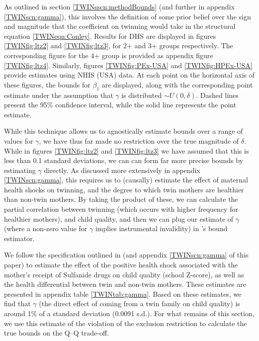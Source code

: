 As outlined in section \ref{TWINsscn:methodBounds} (and further in appendix
\ref{TWINscn:gamma}), this involves the definition of some prior belief over 
the sign and magnitude that the coefficient on twinning would take in the 
structural equation \ref{TWINeqn:Conley}. Results for DHS are displayed in 
figures \ref{TWINfig:ltz2} and \ref{TWINfig:ltz3}, for 2+ and 3+ groups 
respectively. The corresponding figure for the 4+ group is provided as appendix
figure \ref{TWINfig:ltz4}. Similarly, figures \ref{TWINfig:PEx-USA} and
\ref{TWINfig:HPEx-USA} provide estimates using NHIS (USA) data. At each point 
on the horizontal axis of these figures, the bounds for $\beta_1$ are displayed, 
along with the corresponding point estimate under the assumption that $\gamma$ 
is distributed $\sim U(0,\delta)$. Dashed lines present the 95\% confidence 
interval, while the solid line represents the point estimate.

While this technique allows us to agnostically estimate bounds over a range 
of values for $\gamma$, we have thus far made no restriction over the true 
magnitude of $\delta$.  While in figures \ref{TWINfig:ltz2} and 
\ref{TWINfig:ltz3} we have assumed that this is less than 0.1 standard 
deviations, we can can form far more precise bounds by estimating $\gamma$ 
directly.  As discussed more extensively in appendix \ref{TWINscn:gamma}, this 
requires us to (causally) estimate the effect of maternal health shocks on 
twinning, and the degree to which twin mothers are healthier than non-twin
mothers.  By taking the product of these, we can calculate the partial 
correlation between twinning (which occurs with higher frequency for healthier 
mothers), and child quality, and then we can plug our estimate of $\gamma$ 
(where a non-zero value for $\gamma$ implies instrumental invalidity) in 
\citeauthor{Conleyetal2012}'s bound estimator.

We follow the specification outlined in \citet{BhalotraVenkataramani2014}
(and appendix \ref{TWINscn:gamma} of this paper) to estimate the effect of 
the positive health shock associated with the mother's receipt of Sulfanide 
drugs on child quality (school Z-score), as well as the health differential
between twin and non-twin mothers.  These estimates are presented in appendix 
table \ref{TWINtab:gamma}.  Based on these estimates, we find that $\gamma$
(the direct effect of coming from a twin family on child quality) is around
1\% of a standard deviation (0.0091 s.d.).  For what remains of this section, 
we use this estimate of the violation of the exclusion restriction to 
calculate the true bounds on the Q--Q trade-off.

